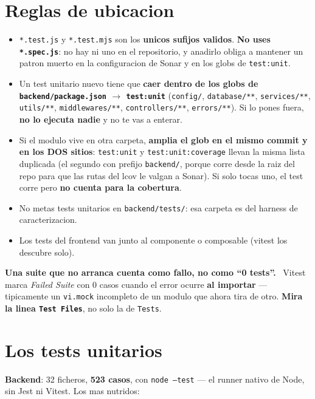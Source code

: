 \documentclass[11pt,a4paper,oneside]{report}
\newenvironment{aviso}[1][Aviso]{%
  \par\medskip
  \colorlet{shadecolor}{orange!14}%
  \begin{shaded}\noindent\textbf{\color{orange!45!black}#1.}\ \ignorespaces}%
  {\end{shaded}\par\medskip}
\newcommand{\rt}[1]{\texttt{#1}}
\begin{document}
\section{Reglas de ubicacion}

\begin{itemize}[leftmargin=1.4em]
  \item \rt{*.test.js} y \rt{*.test.mjs} son los \textbf{unicos sufijos validos}. \textbf{No uses
        \rt{*.spec.js}}: no hay ni uno en el repositorio, y anadirlo obliga a mantener un patron
        muerto en la configuracion de Sonar y en los globs de \rt{test:unit}.
  \item Un test unitario nuevo tiene que \textbf{caer dentro de los globs de
        \rt{backend/package.json} $\rightarrow$ \rt{test:unit}} (\rt{config/}, \rt{database/**},
        \rt{services/**}, \rt{utils/**}, \rt{middlewares/**}, \rt{controllers/**},
        \rt{errors/**}). Si lo pones
        fuera, \textbf{no lo ejecuta nadie} y no te vas a enterar.
  \item Si el modulo vive en otra carpeta, \textbf{amplia el glob en el mismo commit y en los DOS
        sitios}: \rt{test:unit} y \rt{test:unit:coverage} llevan la misma lista duplicada (el
        segundo con prefijo \rt{backend/}, porque corre desde la raiz del repo para que las rutas
        del lcov le valgan a Sonar). Si solo tocas uno, el test corre pero \textbf{no cuenta para
        la cobertura}.
  \item No metas tests unitarios en \rt{backend/tests/}: esa carpeta es del harness de
        caracterizacion.
  \item Los tests del frontend van junto al componente o composable (vitest los descubre solo).
\end{itemize}

\begin{aviso}[Una suite que no arranca cuenta como fallo, no como ``0 tests'']
Vitest marca \emph{Failed Suite} con 0 casos cuando el error ocurre \textbf{al importar} ---
tipicamente un \rt{vi.mock} incompleto de un modulo que ahora tira de otro. \textbf{Mira la
linea \rt{Test Files}}, no solo la de \rt{Tests}.
\end{aviso}

\section{Los tests unitarios}

\textbf{Backend}: 32 ficheros, \textbf{523 casos}, con \rt{node --test} --- el runner nativo de
Node, sin Jest ni Vitest. Los mas nutridos:
\end{document}
